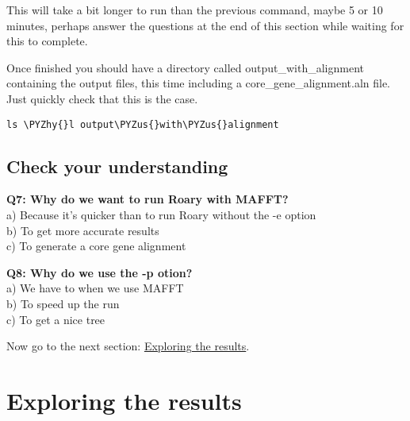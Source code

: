 \documentclass[11pt]{article}
\makeatletter
\def\PYZus{\char`\_}
\def\PYZhy{\char`\-}
\newcommand{\boxspacing}{\kern\kvtcb@left@rule\kern\kvtcb@boxsep}
\newcommand{\prompt}[4]{
         {\ttfamily\llap{{\color{blue}\LARGE\faKeyboardO\hspace{3pt}#4}}\vspace{-\baselineskip}}
    }
\makeatother
\begin{document}
    This will take a bit longer to run than the previous command, maybe 5 or
10 minutes, perhaps answer the questions at the end of this section
while waiting for this to complete.

Once finished you should have a directory called output\_with\_alignment
containing the output files, this time including a
core\_gene\_alignment.aln file. Just quickly check that this is the
case.

    \begin{tcolorbox}[breakable, size=fbox, boxrule=1pt, pad at break*=1mm,colback=cellbackground, colframe=cellborder]
\prompt{In}{incolor}{ }{\boxspacing}
\begin{Verbatim}[commandchars=\\\{\}]
ls \PYZhy{}l output\PYZus{}with\PYZus{}alignment
\end{Verbatim}
\end{tcolorbox}

    \hypertarget{check-your-understanding}{%
\subsection{Check your understanding}\label{check-your-understanding}}

\textbf{Q7: Why do we want to run Roary with MAFFT?}\\
a) Because it's quicker than to run Roary without the -e option\\
b) To get more accurate results\\
c) To generate a core gene alignment

\textbf{Q8: Why do we use the -p otion?}\\
a) We have to when we use MAFFT\\
b) To speed up the run\\
c) To get a nice tree

Now go to the next section: \href{results.ipynb}{Exploring the results}.





\newpage





    \hypertarget{exploring-the-results}{%
\section{Exploring the results}\label{exploring-the-results}}
\end{document}
